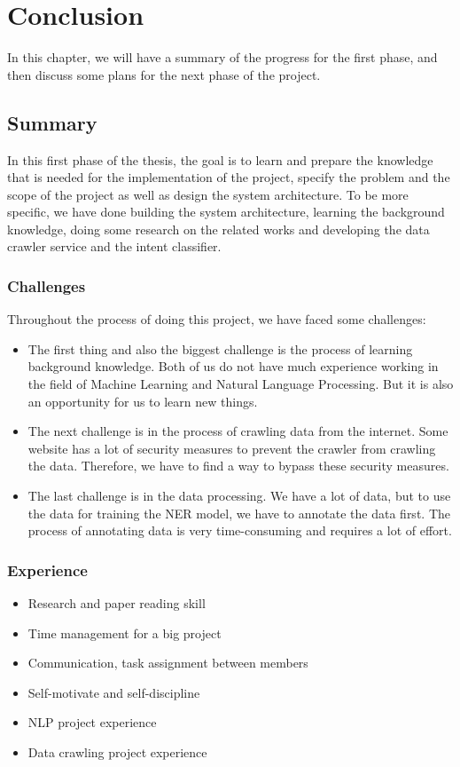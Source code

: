 \chapter{Conclusion}
In this chapter, we will have a summary of the progress for the first phase, and then discuss some plans for the next phase of the project.

\section{Summary}
In this first phase of the thesis, the goal is to learn and prepare the knowledge that is needed for the implementation of the project, specify the problem and the scope of the project as well as design the system architecture. To be more specific, we have done building the system architecture, learning the background knowledge, doing some research on the related works and developing the data crawler service and the intent classifier.

\subsection{Challenges}
Throughout the process of doing this project, we have faced some challenges:

\begin{itemize}
    \item The first thing and also the biggest challenge is the process of learning background knowledge. Both of us do not have much experience working in the field of Machine Learning and Natural Language Processing. But it is also an opportunity for us to learn new things. 

    \item The next challenge is in the process of crawling data from the internet. Some website has a lot of security measures to prevent the crawler from crawling the data. Therefore, we have to find a way to bypass these security measures.

    \item The last challenge is in the data processing. We have a lot of data, but to use the data for training the NER model, we have to annotate the data first. The process of annotating data is very time-consuming and requires a lot of effort.
\end{itemize}

\subsection{Experience}
\begin{itemize}
    \item Research and paper reading skill
    \item Time management for a big project
    \item Communication, task assignment between members
    \item Self-motivate and self-discipline
    \item NLP project experience
    \item Data crawling project experience
\end{itemize}

